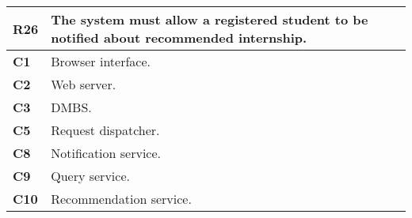 \begin{table}[H]
    \centering
    \begin{tabular}{|l|m{10cm}|}
        \hline \textbf{R26} & The system must allow a registered student to be notified about recommended internship.\\
        \hline \textbf{C1} & Browser interface. \\
        \hline \textbf{C2} & Web server. \\
        \hline \textbf{C3} & DMBS. \\
        \hline \textbf{C5} & Request dispatcher. \\
        \hline \textbf{C8} & Notification service. \\
        \hline \textbf{C9} & Query service. \\
        \hline \textbf{C10} & Recommendation service. \\
        \hline
    \end{tabular}
\end{table}

